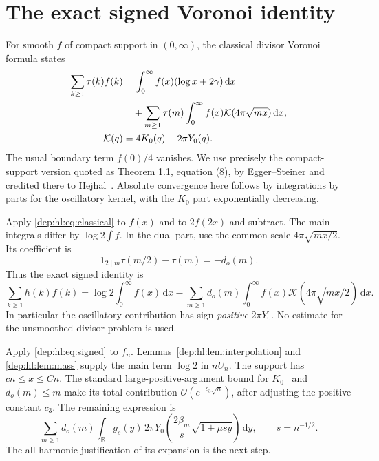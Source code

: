 \documentclass[11pt]{article}
\theoremstyle{definition}\newtheorem{definition}[theorem]{Definition}
\theoremstyle{remark}\newtheorem{remark}[theorem]{Remark}
\newcommand{\OO}{\mathcal O}
\newcommand{\dd}{\,\mathrm d}
\newcommand{\RR}{\mathbb R}
\begin{document}
\section{The exact signed Voronoi identity}\label{dep:hl:sec:voronoi}
For smooth $f$ of compact support in $(0,\infty)$, the classical divisor
Voronoi formula states
\begin{align}\label{dep:hl:eq:classical}
 \sum_{k\ge1}\tau(k)f(k)
 &=\int_0^\infty f(x)(\log x+2\gamma)\dd x\notag\\
 &\quad+\sum_{m\ge1}\tau(m)\int_0^\infty
 f(x)\mathcal K(4\pi\sqrt{mx})\dd x,\\
 \mathcal K(q)&=4K_0(q)-2\pi Y_0(q).\notag
\end{align}
The usual boundary term $f(0)/4$ vanishes. We use precisely the
compact-support version quoted as Theorem 1.1, equation (8), by
Egger--Steiner and credited there to Hejhal~\cite{voronoi}.
Absolute convergence here follows by integrations by parts for the
oscillatory kernel, with the $K_0$ part exponentially decreasing.

Apply \eqref{dep:hl:eq:classical} to $f(x)$ and to $2f(2x)$ and subtract.
The main integrals differ by $\log 2\int f$. In the dual part, use
the common scale $4\pi\sqrt{mx/2}$. Its coefficient is
\[
 \mathbf1_{2\mid m}\tau(m/2)-\tau(m)=-d_o(m).
\]
Thus the exact signed identity is
\begin{equation}\label{dep:hl:eq:signed}
 \sum_{k\ge1}h(k)f(k)=\log 2\int_0^\infty f(x)\dd x
 -\sum_{m\ge1}d_o(m)\int_0^\infty
                 f(x)\mathcal K(4\pi\sqrt{mx/2})\dd x.
\end{equation}
In particular the oscillatory contribution has sign \emph{positive}
$2\pi Y_0$. No estimate for the unsmoothed divisor problem is used.

Apply \eqref{dep:hl:eq:signed} to $f_n$. Lemmas~\ref{dep:hl:lem:interpolation}
and \ref{dep:hl:lem:mass} supply the main term $\log 2$ in $nU_n$.
The support has $cn\le x\le Cn$. The standard large-positive-argument
bound for $K_0$~\cite{dlmfK} and $d_o(m)\le m$ make its total
contribution $\OO(e^{-c_3\sqrt n})$, after adjusting the positive
constant $c_3$. The remaining expression is
\begin{equation}\label{dep:hl:eq:oscintegral}
 \sum_{m\ge1}d_o(m)\int_\RR g_s(y)\,2\pi Y_0
 \left(\frac{2\beta_m}{s}\sqrt{1+\mu sy}\right)\dd y,
 \qquad s=n^{-1/2}.
\end{equation}
The all-harmonic justification of its expansion is the next step.
\end{document}
